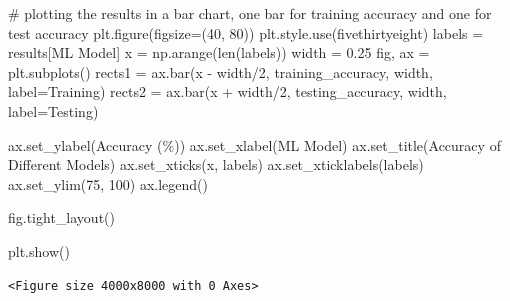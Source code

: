 \documentclass[
  letterpaper,
  DIV=11,
  numbers=noendperiod]{scrartcl}
\newenvironment{Shaded}{\begin{snugshade}}{\end{snugshade}}
\newcommand{\BuiltInTok}[1]{\textcolor[rgb]{0.00,0.23,0.31}{#1}}
\newcommand{\CommentTok}[1]{\textcolor[rgb]{0.37,0.37,0.37}{#1}}
\newcommand{\DecValTok}[1]{\textcolor[rgb]{0.68,0.00,0.00}{#1}}
\newcommand{\FloatTok}[1]{\textcolor[rgb]{0.68,0.00,0.00}{#1}}
\newcommand{\NormalTok}[1]{\textcolor[rgb]{0.00,0.23,0.31}{#1}}
\newcommand{\OperatorTok}[1]{\textcolor[rgb]{0.37,0.37,0.37}{#1}}
\newcommand{\StringTok}[1]{\textcolor[rgb]{0.13,0.47,0.30}{#1}}
\begin{document}
\begin{Shaded}
\begin{Highlighting}[]
\CommentTok{\# plotting the results in a bar chart, one bar for training accuracy and one for test accuracy}
\NormalTok{plt.figure(figsize}\OperatorTok{=}\NormalTok{(}\DecValTok{40}\NormalTok{, }\DecValTok{80}\NormalTok{))}
\NormalTok{plt.style.use(}\StringTok{\textquotesingle{}fivethirtyeight\textquotesingle{}}\NormalTok{)}
\NormalTok{labels }\OperatorTok{=}\NormalTok{ results[}\StringTok{\textquotesingle{}ML Model\textquotesingle{}}\NormalTok{]}
\NormalTok{x }\OperatorTok{=}\NormalTok{ np.arange(}\BuiltInTok{len}\NormalTok{(labels))}
\NormalTok{width }\OperatorTok{=} \FloatTok{0.25}
\NormalTok{fig, ax }\OperatorTok{=}\NormalTok{ plt.subplots()}
\NormalTok{rects1 }\OperatorTok{=}\NormalTok{ ax.bar(x }\OperatorTok{{-}}\NormalTok{ width}\OperatorTok{/}\DecValTok{2}\NormalTok{, training\_accuracy, width, label}\OperatorTok{=}\StringTok{\textquotesingle{}Training\textquotesingle{}}\NormalTok{)}
\NormalTok{rects2 }\OperatorTok{=}\NormalTok{ ax.bar(x }\OperatorTok{+}\NormalTok{ width}\OperatorTok{/}\DecValTok{2}\NormalTok{, testing\_accuracy, width, label}\OperatorTok{=}\StringTok{\textquotesingle{}Testing\textquotesingle{}}\NormalTok{)}



\NormalTok{ax.set\_ylabel(}\StringTok{\textquotesingle{}Accuracy (\%)\textquotesingle{}}\NormalTok{)}
\NormalTok{ax.set\_xlabel(}\StringTok{\textquotesingle{}ML Model\textquotesingle{}}\NormalTok{)}
\NormalTok{ax.set\_title(}\StringTok{\textquotesingle{}Accuracy of Different Models\textquotesingle{}}\NormalTok{)}
\NormalTok{ax.set\_xticks(x, labels)}
\NormalTok{ax.set\_xticklabels(labels)}
\NormalTok{ax.set\_ylim(}\DecValTok{75}\NormalTok{, }\DecValTok{100}\NormalTok{)}
\NormalTok{ax.legend()}

\NormalTok{fig.tight\_layout()}

\NormalTok{plt.show()}
\end{Highlighting}
\end{Shaded}

\begin{verbatim}
<Figure size 4000x8000 with 0 Axes>
\end{verbatim}
\end{document}
